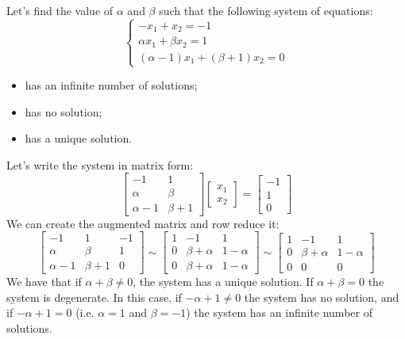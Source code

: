 \begin{exercise}
    Let's find the value of $\alpha$ and $\beta$ such that the following system of equations:
    \[
        \begin{cases}
            -x_1 + x_2 =  -1 \\
            \alpha x_1 + \beta x_2 = 1 \\
            (\alpha -1)x_1 + (\beta + 1)x_2 = 0
        \end{cases}
    \]
    \begin{itemize}[itemsep=1pt,label=$\circ$]
        \item has an infinite number of solutions;
        \item has no solution;
        \item has a unique solution.
    \end{itemize}
    \Answer
    Let's write the system in matrix form:
    \[
        \begin{bmatrix}
            -1 & 1 \\
            \alpha & \beta \\
            \alpha - 1 & \beta + 1
        \end{bmatrix}
        \begin{bmatrix} x_1 \\ x_2 \end{bmatrix}
        =
        \begin{bmatrix} -1 \\ 1 \\ 0 \end{bmatrix}
    \]
    We can create the augmented matrix and row reduce it:
    \[
        \left[\begin{array}{cc|c}
            -1 & 1 & -1 \\
            \alpha & \beta & 1 \\
            \alpha - 1 & \beta + 1 & 0
        \end{array}\right]
        \sim
        \left[\begin{array}{cc|c}
            1 & -1 & 1 \\
            0 & \beta + \alpha & 1 - \alpha \\
            0 & \beta + \alpha & 1 - \alpha
        \end{array}\right]
        \sim
        \left[\begin{array}{cc|c}
            1 & -1 & 1 \\
            0 & \beta + \alpha & 1 - \alpha \\
            0 & 0 & 0
        \end{array}\right]
    \]
    We have that if $\alpha + \beta \neq 0$, the system has a unique solution. If $\alpha + \beta = 0$ the system is degenerate. In this case, if $-\alpha + 1 \neq 0$ the system has no solution, and if $-\alpha + 1 = 0$ (i.e. $\alpha = 1$ and $\beta = -1$) the system has an infinite number of solutions.
\end{exercise}

